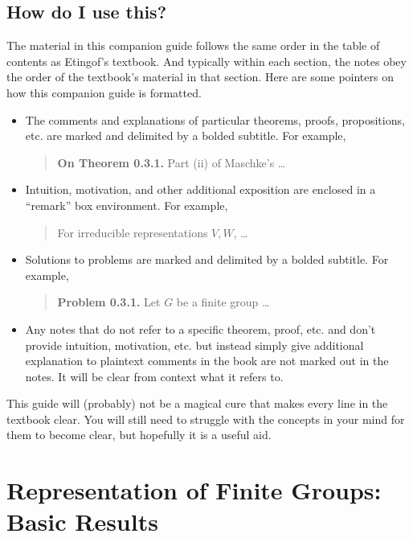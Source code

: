 \documentclass[oneside]{scrbook}
\begin{document}
\section{How do I use this?}
The material in this companion guide follows the same order in the table of contents as Etingof's textbook. And typically within each section, the notes obey the order of the textbook's material in that section. Here are some pointers on how this companion guide is formatted.
\begin{itemize}
    \item The comments and explanations of particular theorems, proofs, propositions, etc. are marked and delimited by a bolded subtitle. For example,
    
    \begin{quote}
        \textbf{\sffamily On Theorem 0.3.1.} \quad Part (ii) of Maschke's \dots
    \end{quote}
    \item Intuition, motivation, and other additional exposition are enclosed in a ``remark'' box environment. For example,
    \\
    \begin{quote}
        \begin{remark}
        For irreducible representations $V,W$, \dots
        \end{remark}
    \end{quote}
    \item Solutions to problems are marked and delimited by a bolded subtitle. For example,
    
    \begin{quote}
        \textbf{Problem 0.3.1.} \quad Let $G$ be a finite group \dots
    \end{quote}
    \item Any notes that do not refer to a specific theorem, proof, etc. and don't provide intuition, motivation, etc. but instead simply give additional explanation to plaintext comments in the book are not marked out in the notes. It will be clear from context what it refers to.
\end{itemize}
This guide will (probably) not be a magical cure that makes every line in the textbook clear. You will still need to struggle with the concepts in your mind for them to become clear, but hopefully it is a useful aid. 

\newpage

\setcounter{chapter}{3}

\chapter{Representation of Finite Groups: Basic Results}
\end{document}
